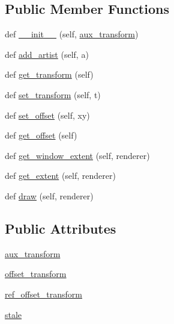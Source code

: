 \subsection*{Public Member Functions}
\begin{DoxyCompactItemize}
\item 
def \hyperlink{classmatplotlib_1_1offsetbox_1_1AuxTransformBox_a0d11eb99b83fba6579fce00c46bcc706}{\+\_\+\+\_\+init\+\_\+\+\_\+} (self, \hyperlink{classmatplotlib_1_1offsetbox_1_1AuxTransformBox_a7581f3afd076527eec84c33c3fc4f4d3}{aux\+\_\+transform})
\item 
def \hyperlink{classmatplotlib_1_1offsetbox_1_1AuxTransformBox_a4f81b602b7d9f9ea481b880bab755ed7}{add\+\_\+artist} (self, a)
\item 
def \hyperlink{classmatplotlib_1_1offsetbox_1_1AuxTransformBox_a17bb4fe118d8a913194524189f8461df}{get\+\_\+transform} (self)
\item 
def \hyperlink{classmatplotlib_1_1offsetbox_1_1AuxTransformBox_adb324e18af4078acb23b8db6d76c179e}{set\+\_\+transform} (self, t)
\item 
def \hyperlink{classmatplotlib_1_1offsetbox_1_1AuxTransformBox_a9391308584455acd71fb373eb29ef5a1}{set\+\_\+offset} (self, xy)
\item 
def \hyperlink{classmatplotlib_1_1offsetbox_1_1AuxTransformBox_ab6b693274cd3d9bdc9ea57c185a12708}{get\+\_\+offset} (self)
\item 
def \hyperlink{classmatplotlib_1_1offsetbox_1_1AuxTransformBox_a61c847fc450cd5a983f562e2327bbfe8}{get\+\_\+window\+\_\+extent} (self, renderer)
\item 
def \hyperlink{classmatplotlib_1_1offsetbox_1_1AuxTransformBox_a399b4e8b4844d7d36fa3ecd44f7717ce}{get\+\_\+extent} (self, renderer)
\item 
def \hyperlink{classmatplotlib_1_1offsetbox_1_1AuxTransformBox_a86eb3e22df6060b7d51171ed764aac46}{draw} (self, renderer)
\end{DoxyCompactItemize}
\subsection*{Public Attributes}
\begin{DoxyCompactItemize}
\item 
\hyperlink{classmatplotlib_1_1offsetbox_1_1AuxTransformBox_a7581f3afd076527eec84c33c3fc4f4d3}{aux\+\_\+transform}
\item 
\hyperlink{classmatplotlib_1_1offsetbox_1_1AuxTransformBox_a00999a041f59671514edd27cb4e8d082}{offset\+\_\+transform}
\item 
\hyperlink{classmatplotlib_1_1offsetbox_1_1AuxTransformBox_a78da465b2d9a311a6e3f4b46144766e5}{ref\+\_\+offset\+\_\+transform}
\item 
\hyperlink{classmatplotlib_1_1offsetbox_1_1AuxTransformBox_a0544ac985038a2441763ab8bb1d4b36c}{stale}
\end{DoxyCompactItemize}


